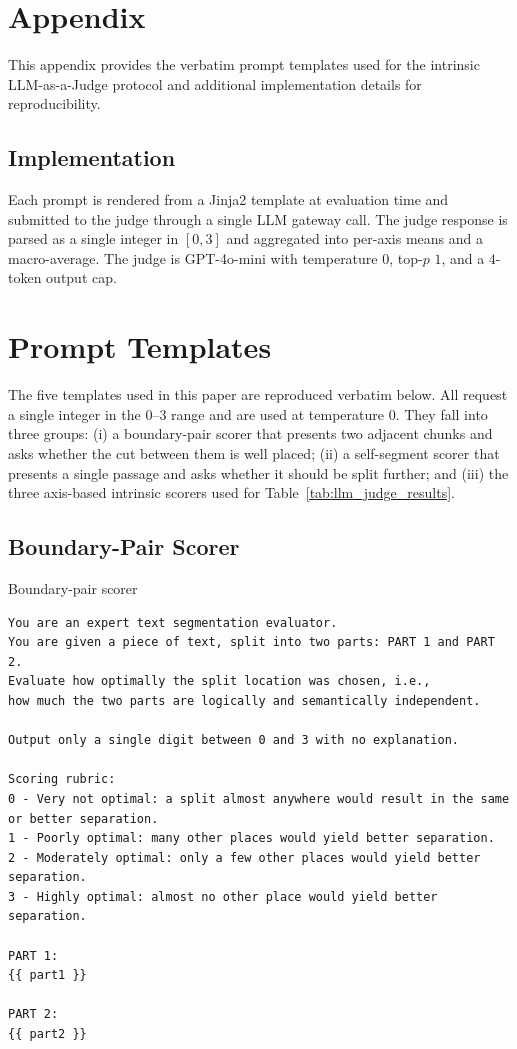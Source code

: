 


\appendix

\section{Appendix}
\label{sec:appendix}
This appendix provides the verbatim prompt templates used for the intrinsic LLM-as-a-Judge protocol and additional implementation details for reproducibility.

\subsection{Implementation}
Each prompt is rendered from a Jinja2 template at evaluation time and submitted to the judge through a single LLM gateway call. The judge response is parsed as a single integer in $[0,3]$ and aggregated into per-axis means and a macro-average. The judge is GPT-4o-mini with temperature $0$, top-$p$ $1$, and a $4$-token output cap.

\section{Prompt Templates}
The five templates used in this paper are reproduced verbatim below. All request a single integer in the $0$--$3$ range and are used at temperature $0$. They fall into three groups: (i) a boundary-pair scorer that presents two adjacent chunks and asks whether the cut between them is well placed; (ii) a self-segment scorer that presents a single passage and asks whether it should be split further; and (iii) the three axis-based intrinsic scorers used for Table~\ref{tab:llm_judge_results}.

\subsection{Boundary-Pair Scorer}

\begin{promptbox}{Boundary-pair scorer}
\begin{lstlisting}
You are an expert text segmentation evaluator.
You are given a piece of text, split into two parts: PART 1 and PART 2.
Evaluate how optimally the split location was chosen, i.e.,
how much the two parts are logically and semantically independent.

Output only a single digit between 0 and 3 with no explanation.

Scoring rubric:
0 - Very not optimal: a split almost anywhere would result in the same or better separation.
1 - Poorly optimal: many other places would yield better separation.
2 - Moderately optimal: only a few other places would yield better separation.
3 - Highly optimal: almost no other place would yield better separation.

PART 1:
{{ part1 }}

PART 2:
{{ part2 }}
\end{lstlisting}
\end{promptbox}

